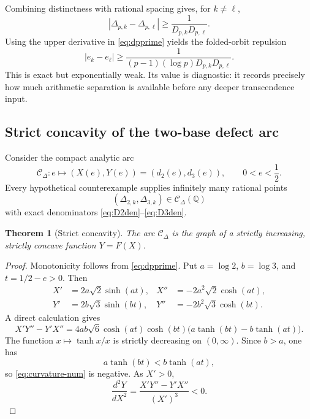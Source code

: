 \documentclass[11pt]{article}
\newtheorem{theorem}{Theorem}[section]
\theoremstyle{definition}
\theoremstyle{remark}
\newcommand{\Q}{\mathbb{Q}}
\begin{document}
Combining distinctness with rational spacing gives, for $k\ne\ell$,
\begin{equation}\label{eq:defect-spacing}
 |\Delta_{p,k}-\Delta_{p,\ell}|
 \ge\frac1{D_{p,k}D_{p,\ell}}.
\end{equation}
Using the upper derivative in \eqref{eq:dpprime} yields the folded-orbit repulsion
\begin{equation}\label{eq:folded-spacing}
 |e_k-e_\ell|
 \ge
 \frac1{(p-1)(\log p)D_{p,k}D_{p,\ell}}.
\end{equation}
This is exact but exponentially weak.  Its value is diagnostic: it records precisely how much arithmetic separation is available before any deeper transcendence input.

\subsection{Strict concavity of the two-base defect arc}

Consider the compact analytic arc
\begin{equation}\label{eq:defect-arc}
 \mathcal C_\Delta:
 e\longmapsto(X(e),Y(e))=(d_2(e),d_3(e)),
 \qquad 0<e<\frac12.
\end{equation}
Every hypothetical counterexample supplies infinitely many rational points
\[
 (\Delta_{2,k},\Delta_{3,k})\in\mathcal C_\Delta(\Q)
\]
with exact denominators \eqref{eq:D2den}--\eqref{eq:D3den}.

\begin{theorem}[Strict concavity]\label{thm:defect-concavity}
The arc $\mathcal C_\Delta$ is the graph of a strictly increasing, strictly concave function $Y=F(X)$.
\end{theorem}

\begin{proof}
Monotonicity follows from \eqref{eq:dpprime}.  Put $a=\log2$, $b=\log3$, and $t=1/2-e>0$.  Then
\begin{align*}
 X'&=2a\sqrt2\sinh(at), & X''&=-2a^2\sqrt2\cosh(at),\\
 Y'&=2b\sqrt3\sinh(bt), & Y''&=-2b^2\sqrt3\cosh(bt).
\end{align*}
A direct calculation gives
\begin{equation}\label{eq:curvature-num}
 X'Y''-Y'X''
 =4ab\sqrt6\cosh(at)\cosh(bt)
 \bigl(a\tanh(bt)-b\tanh(at)\bigr).
\end{equation}
The function $x\mapsto\tanh x/x$ is strictly decreasing on $(0,\infty)$.  Since $b>a$, one has
\[
 a\tanh(bt)<b\tanh(at),
\]
so \eqref{eq:curvature-num} is negative.  As $X'>0$,
\[
 \frac{d^2Y}{dX^2}=\frac{X'Y''-Y'X''}{(X')^3}<0.
\]
\end{proof}
\end{document}
